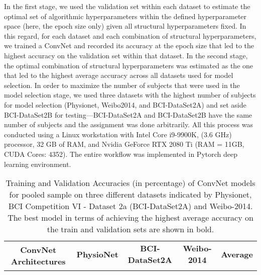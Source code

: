 \documentclass{ieeeaccess}
\newcommand{\ra}[1]{\renewcommand{\arraystretch}{#1}}
\begin{document}
{{In the first stage, we used the validation set within each dataset to estimate the optimal set of algorithmic hyperparameters within the defined hyperparameter space (here, the epoch size only) given all structural hyperparameters fixed. In this regard, for each dataset and each combination of structural hyperparameters, we trained a ConvNet and recorded its accuracy at the epoch size that led to the highest accuracy on the validation set within that dataset. In the second stage, the optimal combination of structural hyperparameters was estimated as the one that led to the highest average accuracy across all datasets used for model selection.}  In order to maximize the number of subjects that were used in the model selection stage, we used three datasets with the highest number of subjects for model selection (Physionet, Weibo2014, and BCI-DataSet2A) and set aside BCI-DataSet2B for testing---BCI-DataSet2A and BCI-DataSet2B have the same number of subjects and the assignment was done arbitrarily.  All this process was conducted using a Linux workstation with Intel Core i9-9900K, (3.6 GHz) processor,  32 GB of RAM, and Nvidia GeForce RTX 2080 Ti (RAM = 11GB,  CUDA Cores: 4352). The entire workflow was implemented in Pytorch deep learning environment.
    
\begin{table*}[htb]  
    \centering\ra{1.2}
    \caption{Training and Validation Accuracies (in percentage) of ConvNet models for pooled sample on three different datasets indicated by Physionet, BCI Competition VI - Dataset 2a (BCI-DataSet2A) and Weibo-2014. The best model in terms of achieving the highest average accuracy on the train and validation sets are shown in bold.} 
    \label{tab:valPool_acc}
    \setlength{\tabcolsep}{8pt} 
    
    \begin{tabular}{|l|cc|cc|cc|cc|}

        \toprule
        \multicolumn{1}{|c|}{\multirow{2}{*}{\textbf{ConvNet Architectures}}} & \multicolumn{2}{c|}{\textbf{PhysioNet}} & \multicolumn{2}{c|}{\textbf{BCI-DataSet2A}} & \multicolumn{2}{c|}{\textbf{Weibo-2014}} & \multicolumn{2}{c|}{\textbf{Average}} \\ %
        \multicolumn{1}{|l|}{}   
        

\end{tabular}
\end{table*}}
\end{document}
